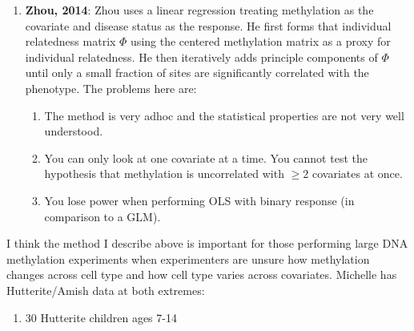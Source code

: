 \documentclass{article}
\begin{document}
\begin{enumerate}
		\item \textbf{Zhou, 2014}: Zhou uses a linear regression treating methylation as the covariate and disease status as the response. He first forms that individual relatedness matrix $\Phi$ using the centered methylation matrix as a proxy for individual relatedness. He then iteratively adds principle components of $\Phi$ until only a small fraction of sites are significantly correlated with the phenotype. The problems here are:
			\begin{enumerate}
			\item The method is very adhoc and the statistical properties are not very well understood.
			\item You can only look at one covariate at a time. You cannot test the hypothesis that methylation is uncorrelated with $\geq 2$ covariates at once.
			\item You lose power when performing OLS with binary response (in comparison to a GLM).
			\end{enumerate}
	\end{enumerate}
I think the method I describe above is important for those performing large DNA methylation experiments when experimenters are unsure how methylation changes across cell type and how cell type varies across covariates. Michelle has Hutterite/Amish data at both extremes:
\begin{enumerate}
\item 30 Hutterite children ages 7-14 
\end{enumerate}
\end{document}
